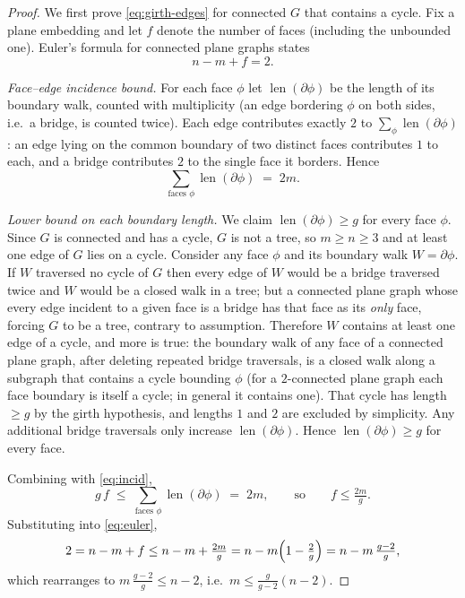 \documentclass{amsart}
\theoremstyle{remark}
\begin{document}
\begin{proof}
We first prove \eqref{eq:girth-edges} for connected $G$ that contains a cycle.
Fix a plane embedding and let $f$ denote the number of faces (including the
unbounded one). Euler's formula for connected plane graphs states
\begin{equation}\label{eq:euler}
   n - m + f = 2 .
\end{equation}

\emph{Face--edge incidence bound.} For each face $\phi$ let
$\operatorname{len}(\partial\phi)$ be the length of its boundary walk, counted
with multiplicity (an edge bordering $\phi$ on both sides, i.e.\ a bridge, is
counted twice). Each edge contributes exactly $2$ to
$\sum_{\phi}\operatorname{len}(\partial\phi)$: an edge lying on the common
boundary of two distinct faces contributes $1$ to each, and a bridge contributes
$2$ to the single face it borders. Hence
\begin{equation}\label{eq:incid}
   \sum_{\text{faces } \phi}\operatorname{len}(\partial\phi)\;=\;2m .
\end{equation}

\emph{Lower bound on each boundary length.} We claim
$\operatorname{len}(\partial\phi)\ge g$ for every face $\phi$. Since $G$ is
connected and has a cycle, $G$ is not a tree, so $m\ge n\ge3$ and at least one
edge of $G$ lies on a cycle. Consider any face $\phi$ and its boundary walk
$W=\partial\phi$. If $W$ traversed no cycle of $G$ then every edge of $W$ would
be a bridge traversed twice and $W$ would be a closed walk in a tree; but a
connected plane graph whose every edge incident to a given face is a bridge has
that face as its \emph{only} face, forcing $G$ to be a tree, contrary to
assumption. Therefore $W$ contains at least one edge of a cycle, and more is
true: the boundary walk of any face of a connected plane graph, after deleting
repeated bridge traversals, is a closed walk along a subgraph that contains a
cycle bounding $\phi$ (for a $2$-connected plane graph each face boundary is
itself a cycle; in general it contains one). That cycle has length $\ge g$ by the
girth hypothesis, and lengths $1$ and $2$ are excluded by simplicity. Any
additional bridge traversals only increase $\operatorname{len}(\partial\phi)$.
Hence $\operatorname{len}(\partial\phi)\ge g$ for every face.

Combining with \eqref{eq:incid},
\[
   g\,f \;\le\; \sum_{\text{faces }\phi}\operatorname{len}(\partial\phi)\;=\;2m,
   \qquad\text{so}\qquad f\le \tfrac{2m}{g}.
\]
Substituting into \eqref{eq:euler},
\[
   2 = n-m+f \le n - m + \tfrac{2m}{g} = n - m\Bigl(1-\tfrac{2}{g}\Bigr)
       = n - m\,\tfrac{g-2}{g},
\]
which rearranges to $m\,\tfrac{g-2}{g}\le n-2$, i.e.\
$m\le \tfrac{g}{g-2}(n-2)$.


\end{proof}
\end{document}
